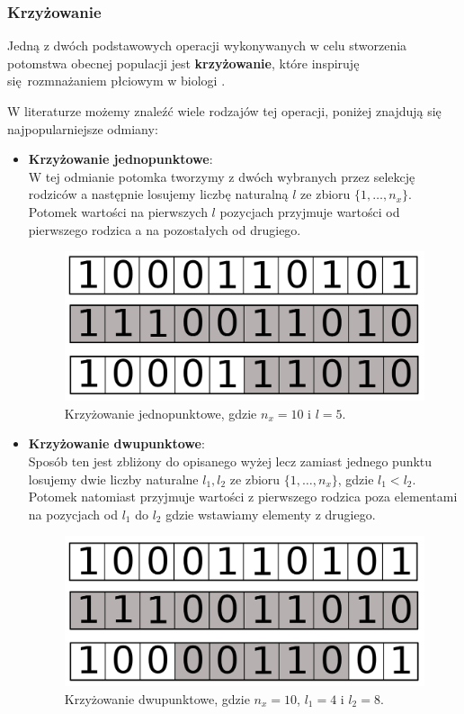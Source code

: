 \documentclass{article}
\begin{document}
\subsubsection{Krzyżowanie}
Jedną z dwóch podstawowych operacji wykonywanych w celu stworzenia potomstwa obecnej populacji
jest \textbf{krzyżowanie}, które inspiruję się rozmnażaniem płciowym w biologi \cite{cross}.

W literaturze możemy znaleźć wiele rodzajów tej operacji, poniżej znajdują się najpopularniejsze
odmiany:
\begin{itemize}
\item \textbf{Krzyżowanie jednopunktowe}:\\
W tej odmianie potomka tworzymy z dwóch wybranych przez selekcję rodziców a następnie 
losujemy liczbę naturalną  $l$ ze zbioru $\{1,\ldots, n_x\}$.
Potomek wartości na pierwszych $l$ pozycjach przyjmuje wartości od pierwszego rodzica
a na pozostałych od drugiego.
\begin{figure}[H]
\centering
\includegraphics[scale=0.2]{crossover_v2.png}
\caption{Krzyżowanie jednopunktowe, gdzie $n_x = 10$ i $l = 5$.}
\end{figure}

\item \textbf{Krzyżowanie dwupunktowe}:\\
Sposób ten jest zbliżony do opisanego wyżej lecz zamiast jednego punktu losujemy dwie liczby
naturalne $l_1, l_2$ ze zbioru $\{1,\ldots, n_x\}$, gdzie $l_1 < l_2$.
Potomek natomiast przyjmuje wartości z pierwszego rodzica poza elementami na pozycjach od
$l_1$ do $l_2$ gdzie wstawiamy elementy z drugiego.

\begin{figure}[H]
\centering
\includegraphics[scale=0.2]{two_crossover_v2.png}
\caption{Krzyżowanie dwupunktowe, gdzie $n_x = 10$, $l_1 = 4$ i $l_2 = 8$.}
\end{figure}


\end{itemize}
\end{document}

